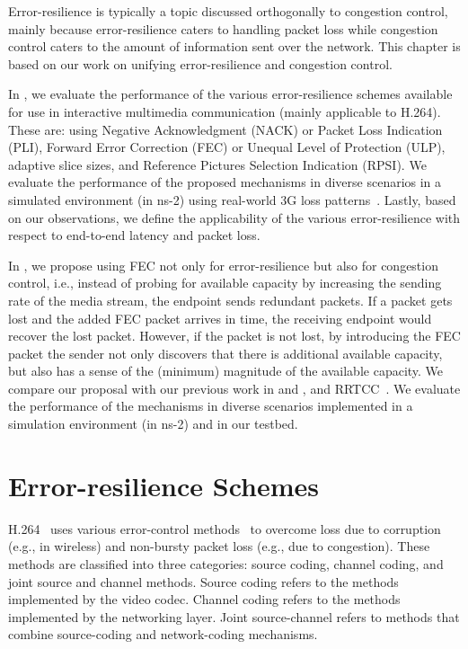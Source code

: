 Error-resilience is typically a topic discussed orthogonally to congestion
control, mainly because error-resilience caters to handling
packet loss while congestion control caters to the amount of information sent
over the network. This chapter is based on our work on unifying
error-resilience and congestion control.

In , we evaluate the performance of the various
error-resilience schemes available for use in interactive multimedia
communication (mainly applicable to H.264). These are: using Negative
Acknowledgment (NACK) or Packet Loss Indication (PLI), Forward Error
Correction (FEC) or Unequal Level of Protection (ULP), adaptive slice sizes,
and Reference Pictures Selection Indication (RPSI). We evaluate the
performance of the proposed mechanisms in diverse scenarios in a simulated
environment (in ns-2) using real-world 3G loss patterns~\cite{3gppSim}.
Lastly, based on our observations, we define the applicability of the various
error-resilience with respect to end-to-end latency and packet loss.

In , we propose using FEC not only for error-resilience but
also for congestion control, i.e., instead of probing for available capacity
by increasing the sending rate of the media stream, the endpoint sends
redundant packets. If a packet gets lost and the added FEC packet arrives in
time, the receiving endpoint would recover the lost packet. However, if the
packet is not lost, by introducing the FEC packet the sender not only
discovers that there is additional available capacity, but also has a sense of
the (minimum) magnitude of the available capacity. We compare our proposal
with our previous work in  and , and 
RRTCC~\cite{draft.rrtcc}. We evaluate the performance of the
mechanisms in diverse scenarios implemented in a simulation environment (in
ns-2) and in our testbed.

\section{Error-resilience Schemes}

H.264~\cite{h264} uses various error-control methods~\cite{err_res_h264_std,
wang98error, wang00review, 310669} to overcome loss due to corruption (e.g.,
in wireless) and non-bursty packet loss (e.g., due to congestion). These
methods are classified into three categories: source coding, channel coding,
and joint source and channel methods. Source coding refers to the methods
implemented by the video codec. Channel coding refers to the methods
implemented by the networking layer. Joint source-channel refers to methods
that combine source-coding and network-coding mechanisms.

